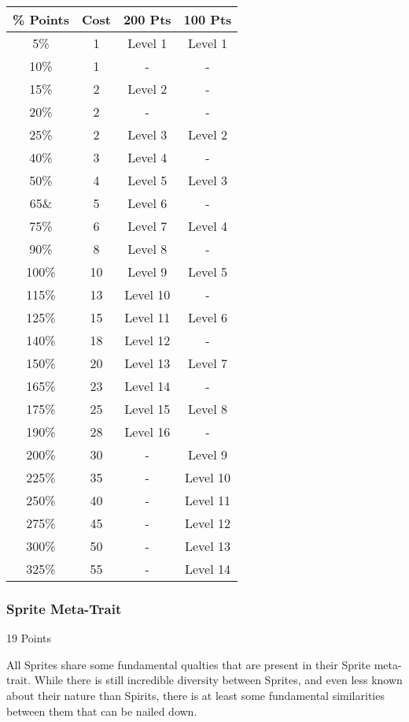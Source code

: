 \begin{multicols*}{3}
	\begin{center} \label{sprite_ally_cost}
	\begin{tabular}{|c|c|c|c|}
		\hline
		\% Points & Cost & 200 Pts & 100 Pts\\
		\hline
		\hline
		5\% & 1 & Level 1 & Level 1 \\
		10\% & 1 & - & - \\
		15\% & 2 & Level 2 & - \\
		20\% & 2 & - & - \\
		25\% & 2 & Level 3 & Level 2 \\
		40\% & 3 & Level 4 & - \\
		50\% & 4 & Level 5 & Level 3 \\
		65\& & 5 & Level 6 & - \\
		75\% & 6 & Level 7 & Level 4 \\
		90\% & 8 & Level 8 & - \\
		100\% & 10 & Level 9 & Level 5 \\
		115\% & 13 & Level 10 & - \\
		125\% & 15 & Level 11 & Level 6 \\
		140\% & 18 & Level 12 & - \\
		150\% & 20 & Level 13 & Level 7 \\
		165\% & 23 & Level 14 & - \\
		175\% & 25 & Level 15 & Level 8 \\
		190\% & 28 & Level 16 & - \\
		200\% & 30 & - & Level 9 \\
		225\% & 35 & - & Level 10 \\
		250\% & 40 & - & Level 11 \\
		275\% & 45 & - & Level 12 \\
		300\% & 50 & - & Level 13 \\
		325\% & 55 & - & Level 14 \\
		\hline
	\end{tabular}
\end{center}

\subsubsection{Sprite Meta-Trait}
\begin{flushright}
	19 Points
\end{flushright}

All Sprites share some fundamental qualties that are present in their Sprite meta-trait. While there is still incredible diversity between Sprites, and even less known about their nature than Spirits, there is at least some fundamental similarities between them that can be nailed down.


\end{multicols*}
